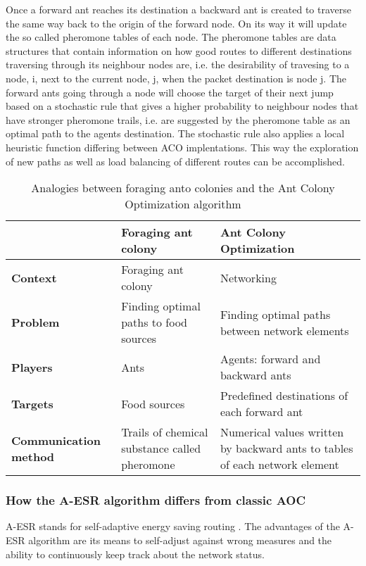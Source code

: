 \documentclass{IWORK2014}
\begin{document}
Once a forward ant reaches its destination a backward ant is created to traverse the same way back to the origin of the forward node. On its way it will update the so called pheromone tables of each node. The pheromone tables are data structures that contain information on how good routes to different destinations traversing through its neighbour nodes are, i.e. the desirability of travesing to a node, i, next to the current node, j, when the packet destination is node j. The forward ants going through a node will choose the target of their next jump based on a stochastic rule that gives a higher probability to neighbour nodes that have stronger pheromone trails, i.e. are suggested by the pheromone table as an optimal path to the agents destination. The stochastic rule also applies a local heuristic function differing between ACO implentations. This way the exploration of new paths as well as load balancing of different routes can be accomplished.

\begin{table}
	\begin{tabularx}{\textwidth}{|X|X|X|}
		\hline & \textbf{Foraging ant colony} & \textbf{Ant Colony Optimization} \\ \hline
		\textbf{Context} & Foraging ant colony & Networking \\ \hline
		\textbf{Problem} & Finding optimal paths to food sources & Finding optimal paths between network elements \\ \hline
		\textbf{Players} & Ants & Agents: forward and backward ants \\ \hline
		\textbf{Targets} & Food sources & Predefined destinations of each forward ant \\ \hline
		\textbf{Communication method} & Trails of chemical substance called pheromone & Numerical values written by backward ants to tables of each network element \\ \hline
	\end{tabularx}
	\caption{Analogies between foraging anto colonies and the Ant Colony Optimization algorithm}
	\label{tbl:analogies_ant}
\end{table}

\subsubsection{How the A-ESR algorithm differs from classic AOC}

A-ESR stands for self-adaptive energy saving routing \cite{kim2012ant}. The advantages of the A-ESR algorithm are its means to self-adjust against wrong measures and the ability to continuously keep track about the network status.
\end{document}
